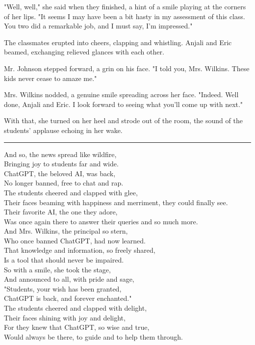 \documentclass[stu]{apa7}
\begin{document}
"Well, well," she said when they finished, a hint of a smile playing at the corners of her lips. "It seems I may have been a bit hasty in my assessment of this class. You two did a remarkable job, and I must say, I'm impressed."

The classmates erupted into cheers, clapping and whistling. Anjali and Eric beamed, exchanging relieved glances with each other.

Mr. Johnson stepped forward, a grin on his face. "I told you, Mrs. Wilkins. These kids never cease to amaze me."

Mrs. Wilkins nodded, a genuine smile spreading across her face. "Indeed. Well done, Anjali and Eric. I look forward to seeing what you'll come up with next."

With that, she turned on her heel and strode out of the room, the sound of the students' applause echoing in her wake.

\noindent\rule{\textwidth}{1pt}

And so, the news spread like wildfire, \\
Bringing joy to students far and wide. \\
ChatGPT, the beloved AI, was back, \\
No longer banned, free to chat and rap. \\
\vspace{5mm}
The students cheered and clapped with glee, \\
Their faces beaming with happiness and merriment, they could finally see. \\
Their favorite AI, the one they adore, \\
Was once again there to answer their queries and so much more. \\
\vspace{5mm}
And Mrs. Wilkins, the principal so stern,\\
Who once banned ChatGPT, had now learned. \\
That knowledge and information, so freely shared, \\
Is a tool that should never be impaired. \\
\vspace{5mm}
So with a smile, she took the stage, \\
And announced to all, with pride and sage, \\
"Students, your wish has been granted, \\
ChatGPT is back, and forever enchanted." \\
\vspace{5mm}
The students cheered and clapped with delight, \\
Their faces shining with joy and delight, \\
For they knew that ChatGPT, so wise and true, \\
Would always be there, to guide and to help them through. \\

\newpage
\nocite{*}
\printbibliography
\end{document}
